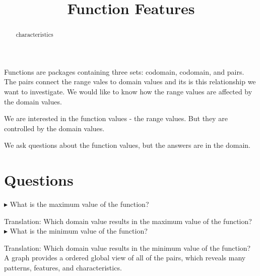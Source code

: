 \documentclass{ximera}
\title{Function Features}
\begin{document}
\begin{abstract}
characteristics
\end{abstract}
\maketitle





Functions are packages containing three sets: codomain, codomain, and pairs.  The pairs connect the range vales to domain values and its is this relationship we want to investigate.   We would like to know how the range values are affected by the domain values. 

We are interested in the function values - the range values.  But they are controlled by the domain values.

We ask questions about the function values, but the answers are in the domain.




\section{Questions}


$\blacktriangleright$ What is the maximum value of the function? 

Translation: Which domain value results in the maximum value of the function? \\


$\blacktriangleright$ What is the minimum value of the function? 

Translation: Which domain value results in the minimum value of the function? \\












A graph provides a ordered global view of all of the pairs, which reveals many patterns, features, and characteristics.
\end{document}
